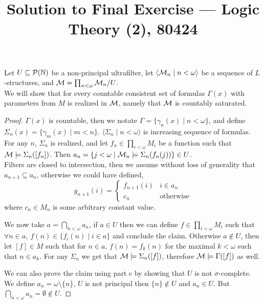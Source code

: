 
\title{Solution to Final Exercise --- Logic Theory (2), 80424}

\DeclareMathOperator{\PA}{PA}
\DeclareMathOperator{\Coll}{Coll}
\DeclareMathOperator{\Ind}{Ind}
\DeclareMathOperator{\Sat}{Sat}
\DeclareMathOperator{\pr}{Pr}
\DeclareMathOperator{\sent}{sent}
\DeclareMathOperator{\form}{form}
\DeclareMathOperator{\val}{Val}
\DeclareMathOperator{\sat}{Sat}
\DeclareMathOperator{\term}{term}
\DeclareMathOperator{\sk}{Sk}
\DeclareMathOperator{\FV}{FV}
\DeclareMathOperator{\con}{Con}


\maketitle
\maketitleprint[yellow]

\question{}
\subquestion{}
Let $U \subseteq \mathcal{P}(\mathbb{N})$ be a non-principal ultrafilter, let $\langle \mathcal{M}_n \mid n < \omega \rangle$ be a sequence of $L$-structures, and $\mathcal{M} = \prod_{n < \omega} \mathcal{M}_n / U$. \\
We will show that for every countable consistent set of formulas $\Gamma(x)$ with parameters from $M$ is realized in $\mathcal{M}$, namely that $\mathcal{M}$ is countably saturated.
\begin{proof}
	$\Gamma(x)$ is countable, then we notate $\Gamma = \{ \gamma_n(x) \mid n < \omega \}$, and define $\Sigma_n(x) = \{ \gamma_m(x) \mid m < n \}$.
	$\langle \Sigma_n \mid n < \omega \rangle$ is increasing sequence of formulas.
	For any $n$, $\Sigma_n$ is realized, and let $f_n \in \prod_{i < \omega} M_i$ be a function such that $\mathcal{M} \models \Sigma_n([f_n])$.
	Then $a_n = \{ j < \omega \mid \mathcal{M}_n \models \Sigma_n(f_n(j)) \} \in U$. \\
	Filters are closed to intersection, then we assume without loss of generality that $a_{n + 1} \subseteq a_n$, otherwise we could have defined,
	\[
		g_{n + 1}(i) = \begin{cases}
			f_{n + 1}(i) & i \in a_n \\
			c_n & \text{otherwise}
		\end{cases}
	\]
	where $c_n \in M_n$ is some arbitrary constant value.

	We now take $a = \bigcap_{n < \omega} a_n$, if $a \in U$ then we can define $f \in \prod_{i < \omega} M_i$ such that $\forall n \in a,\ f(n) \in \{ f_i(n) \mid i \in a \}$ and conclude the claim.
	Otherwise $a \notin U$, then let $[f] \in M$ such that for $n \in a$, $f(n) = f_k(n)$ for the maximal $k < \omega$ such that $n \in a_k$.
	For any $\Sigma_n$ we get that $\mathcal{M} \models \Sigma_n([f])$, therefore $\mathcal{M} \models \Gamma([f])$ as well.

	We can also prove the claim using part c by showing that $U$ is not $\sigma$-complete. \\
	We define $a_n = \omega \setminus \{ n \}$, $U$ is not principal then $\{ n \} \notin U$ and $a_n \in U$.
	But $\bigcap_{n < \omega} a_n = \emptyset \notin U$.
\end{proof}

